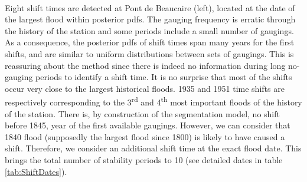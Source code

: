 \documentclass[11pt]{article}
\begin{document}
    \paragraph{}
    Eight shift times are detected at Pont de Beaucaire (left), located at the date of the largest flood within posterior pdfs. The gauging frequency is erratic through the history of the station and some periods include a small number of gaugings. As a consequence, the posterior pdfs of shift times span many years for the first shifts, and are similar to uniform distributions between sets of gaugings. This is reassuring about the method since there is indeed no information during long no-gauging periods to identify a shift time. It is no surprise that most of the shifts occur very close to the largest historical floods. 1935 and 1951 time shifts are respectively corresponding to the 3\textsuperscript{rd} and 4\textsuperscript{th} most important floods of the history of the station. There is, by construction of the segmentation model, no shift before 1845, year of the first available gaugings. However, we can consider that 1840 flood (supposedly the largest flood since 1800) is likely to have caused a shift. Therefore, we consider an additional shift time at the exact flood date. This brings the total number of stability periods to 10 (see detailed dates in table \ref{tab:ShiftDates}). 
    
\end{document}

